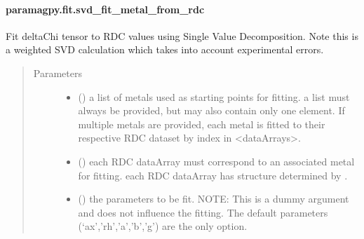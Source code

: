\documentclass[a4paper,10pt,english,openany,oneside]{sphinxmanual}
\begin{document}
\paragraph{paramagpy.fit.svd\_fit\_metal\_from\_rdc}
\label{\detokenize{reference/generated/paramagpy.fit.svd_fit_metal_from_rdc:paramagpy-fit-svd-fit-metal-from-rdc}}\label{\detokenize{reference/generated/paramagpy.fit.svd_fit_metal_from_rdc::doc}}

\begin{fulllineitems}
\label{\detokenize{reference/generated/paramagpy.fit.svd_fit_metal_from_rdc:paramagpy.fit.svd_fit_metal_from_rdc}}
Fit deltaChi tensor to RDC values using Single Value Decomposition.
Note this is a weighted SVD calculation which takes into account
experimental errors.
\begin{quote}\begin{description}
\item[{Parameters}] \leavevmode\begin{itemize}
\item {} 
 () \textendash{} a list of metals used as starting points for fitting.
a list must always be provided, but may also contain
only one element. If multiple metals are provided, each metal
is fitted to their respective RDC dataset by index in \textless{}dataArrays\textgreater{}.

\item {} 
 () \textendash{} each RDC dataArray must correspond to an associated metal for fitting.
each RDC dataArray has structure determined by
{\hyperref[\detokenize{reference/generated/paramagpy.protein.CustomStructure.parse:paramagpy.protein.CustomStructure.parse}]{}}.

\item {} 
 () \textendash{} the parameters to be fit.
NOTE: This is a dummy argument and does not influence the fitting.
The default parameters (‘ax’,’rh’,’a’,’b’,’g’) are the only option.


\end{itemize}
\end{description}
\end{quote}
\end{fulllineitems}
\end{document}
